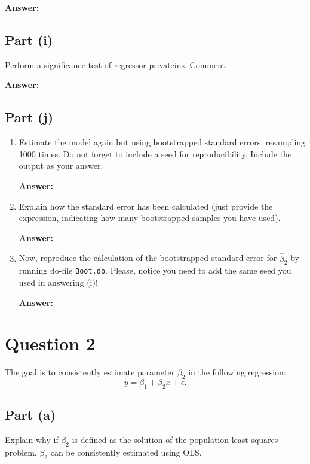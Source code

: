 \documentclass[12pt,a4paper]{article}
\begin{document}
\textbf{Answer:}



\subsection*{Part (i)}
Perform a significance test of regressor privateins. Comment.

\textbf{Answer:}



\subsection*{Part (j)}
\begin{enumerate}[label=(\roman*)]
  \item Estimate the model again but using bootstrapped standard errors, resampling 1000 times. Do not forget to include a seed for reproducibility. Include the output as your answer.
  
  \textbf{Answer:}
  
  
  
  \item Explain how the standard error has been calculated (just provide the expression, indicating how many bootstrapped samples you have used).
  
  \textbf{Answer:}
  
  
  
  \item Now, reproduce the calculation of the bootstrapped standard error for $\hat{\beta}_2$ by running do-file \texttt{Boot.do}. Please, notice you need to add the same seed you used in answering (i)!
  
  \textbf{Answer:}
  
  
\end{enumerate}

\newpage

\section*{Question 2}
The goal is to consistently estimate parameter $\beta_2$ in the following regression:
\[
y = \beta_1 + \beta_2x + \epsilon.
\]

\subsection*{Part (a)}
Explain why if $\beta_2$ is defined as the solution of the population least squares problem, $\beta_2$ can be consistently estimated using OLS.
\end{document}
